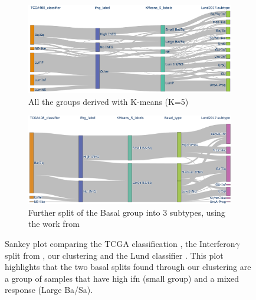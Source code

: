 \begin{figure}[!t]
    \centering
    \begin{subfigure}[!t]{1.0\textwidth}
    \includegraphics[width=1.0\textwidth,keepaspectratio]{Sections/ClusteringAnalysis/Resources/discussion/inf_comp.png}
        \caption{All the groups derived with K-means (K=5)}
        \label{fig:cs:ifn_all}
    \end{subfigure}
    \centering
    \begin{subfigure}[!t]{1.0\textwidth}
        \includegraphics[width=\textwidth,keepaspectratio]{Sections/ClusteringAnalysis/Resources/discussion/inf_3_basal.png}
        \caption{Further split of the Basal group into 3 subtypes, using the work from \citet{Baker2022-bj}}
        \label{fig:cs:ifn_three_basal}
    \end{subfigure} 
    \centering
    \caption[MIBC groups comparisons over previous classifications]{Sankey plot comparing the TCGA classification \citet{Robertson2017-mg}, the Interferon$\gamma$ split from \cite{Baker2022-bj}, our clustering and the Lund classifier \citet{Marzouka2018-ge}. This plot highlights that the two basal splits found through our clustering are a group of samples that have high \acrshort{ifn} (small group) and a mixed response (Large Ba/Sa). }
    \label{fig:cs:ifn_comp}
\end{figure}

